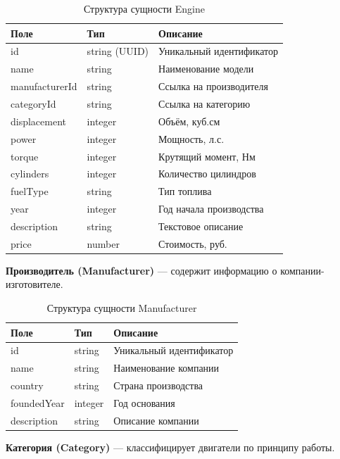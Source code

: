 \documentclass[14pt,a4paper]{extarticle}
\begin{document}
\begin{table}[h!]
\caption{Структура сущности Engine}
\begin{tabular}{|p{3.5cm}|p{3.5cm}|p{7cm}|}
\hline
\textbf{Поле} & \textbf{Тип} & \textbf{Описание} \\
\hline
id             & string (UUID) & Уникальный идентификатор \\
name           & string        & Наименование модели \\
manufacturerId & string        & Ссылка на производителя \\
categoryId     & string        & Ссылка на категорию \\
displacement   & integer       & Объём, куб.см \\
power          & integer       & Мощность, л.с. \\
torque         & integer       & Крутящий момент, Нм \\
cylinders      & integer       & Количество цилиндров \\
fuelType       & string        & Тип топлива \\
year           & integer       & Год начала производства \\
description    & string        & Текстовое описание \\
price          & number        & Стоимость, руб. \\
\hline
\end{tabular}
\end{table}

\textbf{Производитель (Manufacturer)} --- содержит информацию о компании-изготовителе.

\begin{table}[h!]
\caption{Структура сущности Manufacturer}
\begin{tabular}{|p{3.5cm}|p{3.5cm}|p{7cm}|}
\hline
\textbf{Поле} & \textbf{Тип} & \textbf{Описание} \\
\hline
id          & string  & Уникальный идентификатор \\
name        & string  & Наименование компании \\
country     & string  & Страна производства \\
foundedYear & integer & Год основания \\
description & string  & Описание компании \\
\hline
\end{tabular}
\end{table}

\textbf{Категория (Category)} --- классифицирует двигатели по принципу работы.
\end{document}
